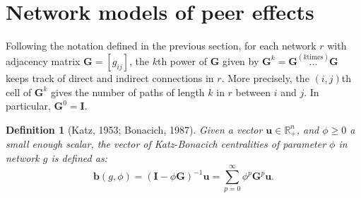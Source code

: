 \documentclass[nojss]{jss}
\newtheorem{definition}{Definition}
\begin{document}
\section{Network models of peer effects} \label{sec:models}
Following the notation defined in the previous section, for each network $r$ with adjacency matrix $\boldsymbol{G}=[g_{ij}]$, the $k$th power of $\boldsymbol{G}$ given by $\boldsymbol{G}^{k}= \boldsymbol{G}\overset{(k\text{times})}{\boldsymbol{...}}\boldsymbol{G}$ keeps track of direct and indirect connections in $r$. More precisely, the $(i,j)$th cell of $\boldsymbol{G}^{k}$ gives the number of paths of length $k$ in $r$ between $i$ and $j$. In particular, $\boldsymbol{G}^{0}=\boldsymbol{I}$.

\begin{definition}[Katz, 1953; Bonacich, 1987] \label{Def1}
Given a vector $\boldsymbol{u}\in \mathbb{R}_{+}^{n}$, and $\phi\geq 0$ a small enough scalar, the vector of Katz-Bonacich centralities of parameter $\phi$ in network $g$ is defined as: 
\begin{equation}
\boldsymbol{b}\left( g,\phi \right) =\left( \boldsymbol{I}-\phi \boldsymbol{G}\right) ^{-1}\boldsymbol{u=}\sum\limits_{p=0}^{\infty}\phi ^{p}%
\boldsymbol{G}^{p}\boldsymbol{u}.  
\label{KB}
\end{equation}
\end{definition}
\end{document}
